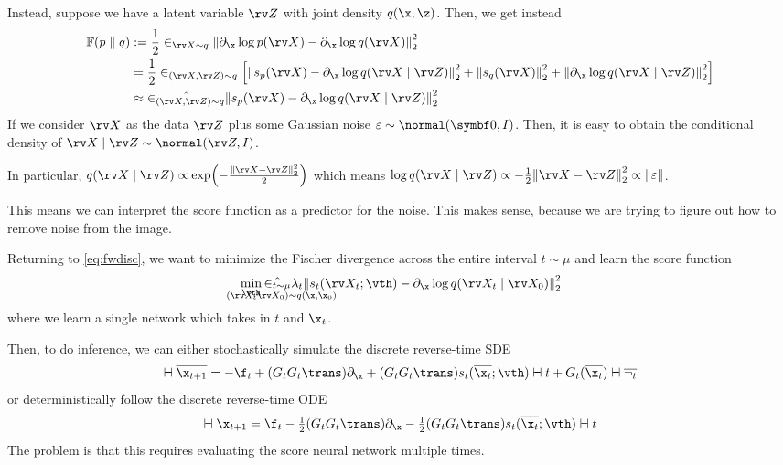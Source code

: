 \documentclass[class=cs480,notes,tikz]{agony}
\begin{document}
Instead, suppose we have a latent variable $\rv Z$ with joint density $q(\x,\z)$.
Then, we get instead
\begin{align*}
  \F(p \parallel q)
   & := \frac12\E_{\rv X \sim q} \norm{\partial_{\x}\log p(\rv X) - \partial_{\x}\log q(\rv X)}_2^2                                                                         \\
   & = \frac12\E_{(\rv X,\rv Z) \sim q} \qty[\norm{s_p(\rv X) - \partial_{\x}\log q(\rv X \mid \rv Z)}_2^2 + \norm{s_q(\rv X)}^2_2 + \norm{\partial_{\x}\log q(\rv X \mid \rv Z)}_2^2] \\
   & \approx \hat{\E_{(\rv X,\rv Z)\sim q}} \norm{s_p(\rv X) - \partial_{\x}\log q(\rv X \mid \rv Z)}_2^2
\end{align*}
If we consider $\rv X$ as the data $\rv Z$ plus some Gaussian noise $\varepsilon \sim \normal(\symbf0,I)$.
Then, it is easy to obtain the conditional density of $\rv X \mid \rv Z \sim \normal(\rv Z,I)$.

In particular, $q(\rv X \mid \rv Z) \propto \exp(-\frac{\norm{\rv X -\rv Z}_2^2}{2})$
which means $\log q(\rv X \mid \rv Z) \propto -\frac12\norm{\rv X - \rv Z}_2^2 \propto \norm{\varepsilon}$.

This means we can interpret the score function as a predictor for the noise.
This makes sense, because we are trying to figure out how to remove noise from the image.

Returning to \cref{eq:fwdisc}, we want to minimize the Fischer divergence
across the entire interval $t \sim \mu$ and learn the score function
\begin{equation*}\label{eq:scoremodel}
  \min_{\vth} \hat{\E_{\scriptscriptstyle\substack{t \sim \mu \\ \mathclap{(\rv X_t \rv X_0) \sim q(\x,\x_0)}}}}
  \lambda_t \norm{s_t(\rv X_t; \vth) - \partial_{\x}\log q(\rv X_t \mid \rv X_0)}_2^2
\end{equation*}
where we learn a single network which takes in $t$ and $\x_t$.

Then, to do inference, we can either stochastically simulate the discrete reverse-time SDE
\[ \dd{\overline{\x_{t+1}}} = -\f_t + (G_tG_t\trans)\partial_{\x} + (G_tG_t\trans)s_t(\overline{\x_t};\vth) \dd{t} + G_t(\overline{\x_t}) \dd{\overline{\n_t}} \]
or deterministically follow the discrete reverse-time ODE
\[ \dd{\x_{t+1}} = \f_t - \tfrac12(G_tG_t\trans)\partial_{\x} - \tfrac12(G_tG_t\trans)s_t(\overline{\x_t};\vth) \dd{t} \]
The problem is that this requires evaluating the score neural network multiple times.
\end{document}
